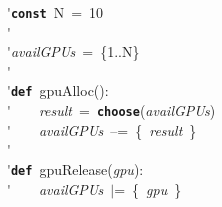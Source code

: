 \'\>\texttt{\textbf{const}}~N~=~10\\

\'\>\\

\'\>\textit{availGPUs}~=~\{1..N\}\\

\'\>\\

\'\>\texttt{\textbf{def}}~gpuAlloc():\\

\'\>~~~~\textit{result}~=~\texttt{\textbf{choose}}(\textit{availGPUs})\\

\'\>~~~~\textit{availGPUs}~--=~\{~\textit{result}~\}\\

\'\>\\

\'\>\texttt{\textbf{def}}~gpuRelease(\textit{gpu}):\\

\'\>~~~~\textit{availGPUs}~$\vert$=~\{~\textit{gpu}~\}